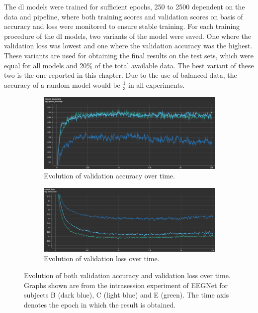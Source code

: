 The \gls{dl} models were trained for sufficient epochs, 250 to 2500 dependent on the data and pipeline, where both training scores and validation scores on basis of accuracy and loss were monitored to ensure stable training.
For each training procedure of the \gls{dl} models, two variants of the model were saved.
One where the validation loss was lowest and one where the validation accuracy was the highest.
These variants are used for obtaining the final results on the test sets, which were equal for all models and 20\% of the total available data.
The best variant of these two is the one reported in this chapter.
Due to the use of balanced data, the accuracy of a random model would be $\frac{1}{3}$ in all experiments.

\begin{figure}[ht]
    \centering
    \begin{subfigure}{0.9\textwidth}
        \centering
        \includegraphics[width=\textwidth]{../images/results/accuracy.pdf}
        \captionsetup{width=\linewidth}
        \captionsetup{justification=centering}
        \caption{Evolution of validation accuracy over time.}
        \label{fig:results_tensorboard_acc}
    \end{subfigure}
    \hfill
    \vfill
    \begin{subfigure}{0.9\textwidth}
        \centering
        \includegraphics[width=\textwidth]{../images/results/loss.pdf}
        \captionsetup{width=\linewidth}
        \captionsetup{justification=centering}
        \caption{Evolution of validation loss over time.}
        \label{fig:results_tensorboard_loss}
    \end{subfigure}
    \captionsetup{width=\linewidth}
    \captionsetup{justification=centering}
    \caption{Evolution of both validation accuracy and validation loss over time. Graphs shown are from the intrasession experiment of EEGNet for subjects B (dark blue), C (light blue) and E (green). The time axis denotes the epoch in which the result is obtained.}
    \label{fig:results_tensorboard}
\end{figure}

